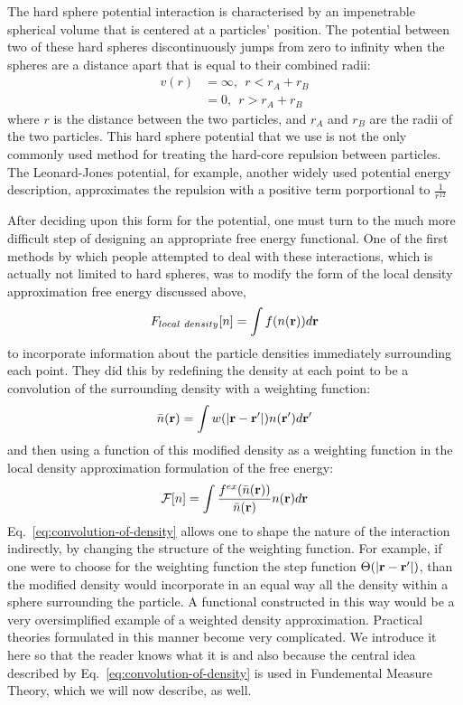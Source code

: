 The hard sphere potential interaction is characterised by an
impenetrable spherical volume that is centered at a particles'
position.  The potential between two of these hard spheres
discontinuously jumps from zero to infinity when the spheres are a
distance apart that is equal to their combined radii:
\begin{align}
  v(r) &= \infty,~~ r < r_A + r_B \\
  &= 0,~~ r > r_A + r_B
\end{align}
where $r$ is the distance between the two particles, and $r_A$ and
$r_B$ are the radii of the two particles.  This hard sphere potential
that we use is not the only commonly used method for treating the
hard-core repulsion between particles.  The Leonard-Jones potential,
for example, another widely used potential energy description,
approximates the repulsion with a positive term porportional to
$\frac{1}{r^{12}}$


After deciding upon this form for the potential, one must turn to the
much more difficult step of designing an appropriate free energy
functional.  One of the first methods by which people attempted to
deal with these interactions, which is actually not limited to hard
spheres, was to modify the form of the local density approximation
free energy discussed above,
\begin{align}
  F_{local~density}[n] = \int f(n(\textbf{r})) d\textbf{r}
\end{align}
to incorporate information about the particle densities immediately
surrounding each point.  They did this by redefining the density at
each point to be a convolution of the surrounding density with a
weighting function:
\begin{align}
  \label{eq:convolution-of-density}
  \bar{n}(\textbf{r}) = \int w(|\textbf{r}-\textbf{r}'|) n(\textbf{r}') d\textbf{r}'
\end{align}
and then using a function of this modified density as a weighting
function in the local density approximation formulation of the free
energy:
\begin{align}
  \mathcal{F}[n] = \int \frac{f^{ex}(\bar{n}(\textbf{r}))}{\bar{n}(\textbf{r})} n(\textbf{r}) d\textbf{r}
\end{align}
Eq.~\ref{eq:convolution-of-density} allows one to shape the nature of
the interaction indirectly, by changing the structure of the weighting
function.  For example, if one were to choose for the weighting
function the step function $\Theta(|\textbf{r}-\textbf{r}'|)$, than the modified
density would incorporate in an equal way all the density within a
sphere surrounding the particle.  A functional constructed in this way
would be a very oversimplified example of a weighted density
approximation.  Practical theories formulated in this manner become
very complicated.  We introduce it here so that the reader knows what
it is and also because the central idea described by
Eq.~\ref{eq:convolution-of-density} is used in Fundemental Measure
Theory, which we will now describe, as well.

